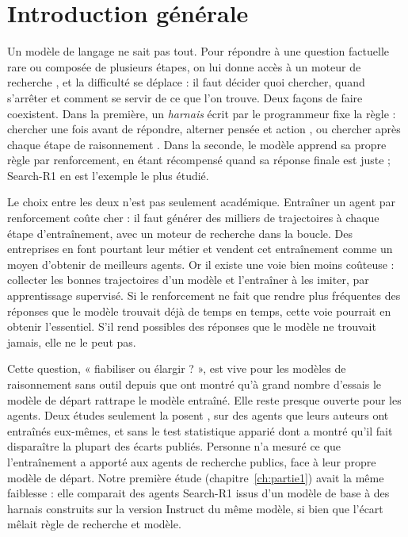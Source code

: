 \chapter{Introduction générale}\label{ch:intro}

Un modèle de langage ne sait pas tout. Pour répondre à une question factuelle rare ou composée de plusieurs étapes, on lui donne accès à un moteur de recherche \citep{lewis2020retrieval}, et la difficulté se déplace : il faut décider quoi chercher, quand s'arrêter et comment se servir de ce que l'on trouve. Deux façons de faire coexistent. Dans la première, un \emph{harnais} écrit par le programmeur fixe la règle : chercher une fois avant de répondre, alterner pensée et action \citep{yao2022react}, ou chercher après chaque étape de raisonnement \citep{trivedi2022interleaving}. Dans la seconde, le modèle apprend sa propre règle par renforcement, en étant récompensé quand sa réponse finale est juste ; Search-R1 \citep{jin2025search} en est l'exemple le plus étudié.

Le choix entre les deux n'est pas seulement académique. Entraîner un agent par renforcement coûte cher : il faut générer des milliers de trajectoires à chaque étape d'entraînement, avec un moteur de recherche dans la boucle. Des entreprises en font pourtant leur métier et vendent cet entraînement comme un moyen d'obtenir de meilleurs agents. Or il existe une voie bien moins coûteuse : collecter les bonnes trajectoires d'un modèle et l'entraîner à les imiter, par apprentissage supervisé. Si le renforcement ne fait que rendre plus fréquentes des réponses que le modèle trouvait déjà de temps en temps, cette voie pourrait en obtenir l'essentiel. S'il rend possibles des réponses que le modèle ne trouvait jamais, elle ne le peut pas.

Cette question, « fiabiliser ou élargir ? », est vive pour les modèles de raisonnement sans outil depuis que \citet{yue2025does} ont montré qu'à grand nombre d'essais le modèle de départ rattrape le modèle entraîné. Elle reste presque ouverte pour les agents. Deux études seulement la posent \citep{zhai2026does,zhu2026what}, sur des agents que leurs auteurs ont entraînés eux-mêmes, et sans le test statistique apparié dont \citet{yang2026crossovers} a montré qu'il fait disparaître la plupart des écarts publiés. Personne n'a mesuré ce que l'entraînement a apporté aux agents de recherche publics, face à leur propre modèle de départ. Notre première étude (chapitre~\ref{ch:partie1}) avait la même faiblesse : elle comparait des agents Search-R1 issus d'un modèle de base à des harnais construits sur la version Instruct du même modèle, si bien que l'écart mêlait règle de recherche et modèle.

